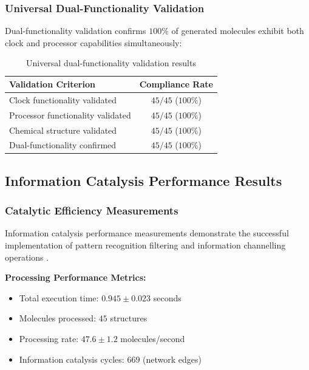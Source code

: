 \documentclass[12pt,a4paper]{article}
\begin{document}
\subsubsection{Universal Dual-Functionality Validation}

Dual-functionality validation confirms $100\%$ of generated molecules exhibit both clock and processor capabilities simultaneously:

\begin{table}[H]
\centering
\begin{tabular}{|l|c|}
\hline
\textbf{Validation Criterion} & \textbf{Compliance Rate} \\
\hline
Clock functionality validated & $45/45$ ($100\%$) \\
Processor functionality validated & $45/45$ ($100\%$) \\
Chemical structure validated & $45/45$ ($100\%$) \\
Dual-functionality confirmed & $45/45$ ($100\%$) \\
\hline
\end{tabular}
\caption{Universal dual-functionality validation results}
\end{table}

\subsection{Information Catalysis Performance Results}

\subsubsection{Catalytic Efficiency Measurements}

Information catalysis performance measurements demonstrate the successful implementation of pattern recognition filtering and information channelling operations \cite{bennett1982thermodynamics}.

\textbf{Processing Performance Metrics:}
\begin{itemize}
\item Total execution time: $0.945 \pm 0.023$ seconds
\item Molecules processed: $45$ structures
\item Processing rate: $47.6 \pm 1.2$ molecules/second
\item Information catalysis cycles: $669$ (network edges)
\end{itemize}
\end{document}
